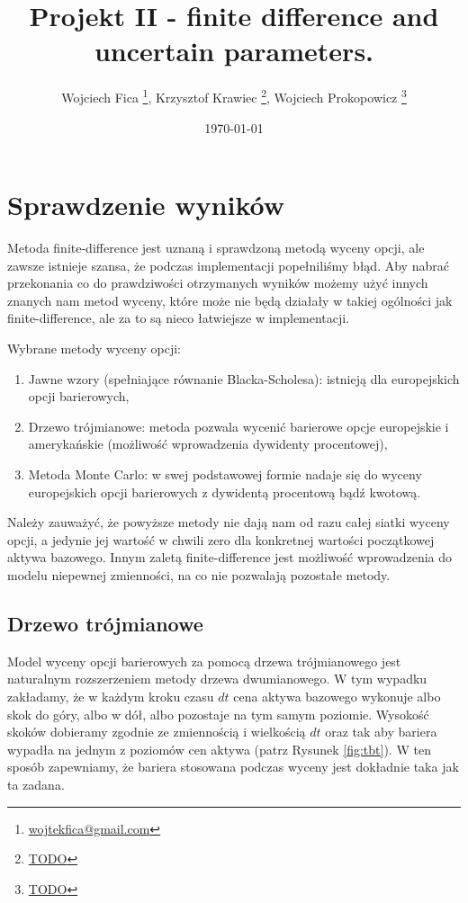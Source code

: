 \documentclass[12pt]{article}
\title{Projekt II - finite difference and uncertain parameters.}
\author{Wojciech Fica \footnote{\href{mailto:wojtekfica@gmail.com}{wojtekfica@gmail.com}}, Krzysztof Krawiec \footnote{\href{mailto:TODO}{TODO}}, Wojciech Prokopowicz \footnote{\href{mailto:TODO}{TODO}}}
\date{\today}
\begin{document}
\section{Sprawdzenie wyników}
Metoda finite-difference jest uznaną i sprawdzoną metodą wyceny opcji, ale zawsze istnieje szansa, że podczas implementacji popełniliśmy błąd. Aby nabrać przekonania co do prawdziwości otrzymanych wyników możemy użyć innych znanych nam metod wyceny, które może nie będą działały w takiej ogólności jak finite-difference, ale za to są nieco łatwiejsze w implementacji.

Wybrane metody wyceny opcji:
\begin{enumerate}
    \item Jawne wzory (spełniające równanie Blacka-Scholesa): istnieją dla europejskich opcji barierowych,
    \item Drzewo trójmianowe: metoda pozwala wycenić barierowe opcje europejskie i amerykańskie (możliwość wprowadzenia dywidenty procentowej),
    \item Metoda Monte Carlo: w swej podstawowej formie nadaje się do wyceny europejskich opcji barierowych z dywidentą procentową bądź kwotową.
\end{enumerate}

Należy zauważyć, że powyższe metody nie dają nam od razu całej siatki wyceny opcji, a jedynie jej wartość w chwili zero dla konkretnej wartości początkowej aktywa bazowego. Innym zaletą finite-difference jest możliwość wprowadzenia do modelu niepewnej zmienności, na co nie pozwalają pozostałe metody.

\subsection{Drzewo trójmianowe}

Model wyceny opcji barierowych za pomocą drzewa trójmianowego jest naturalnym rozszerzeniem metody drzewa dwumianowego. W tym wypadku zakładamy, że w każdym kroku czasu \(dt\) cena aktywa bazowego wykonuje albo skok do góry, albo w dół, albo pozostaje na tym samym poziomie. Wysokość skoków dobieramy zgodnie ze zmiennością i wielkością \(dt\) oraz tak aby bariera wypadła na jednym z poziomów cen aktywa (patrz Rysunek \ref{fig:tbt}). W ten sposób zapewniamy, że bariera stosowana podczas wyceny jest dokładnie taka jak ta zadana. 
\end{document}

